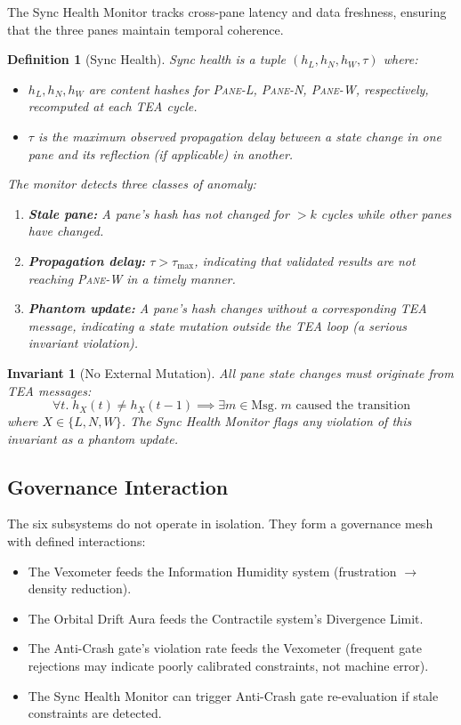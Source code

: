 \documentclass[11pt,a4paper]{article}
\newtheorem{definition}{Definition}[section]
\newtheorem{invariant}{Invariant}[section]
\newcommand{\paneL}{\textsc{Pane-L}}
\newcommand{\paneN}{\textsc{Pane-N}}
\newcommand{\paneW}{\textsc{Pane-W}}
\newcommand{\tea}{\textsc{TEA}}
\begin{document}
The Sync Health Monitor tracks cross-pane latency and data freshness,
ensuring that the three panes maintain temporal coherence.

\begin{definition}[Sync Health]\label{def:sync}
Sync health is a tuple $(h_L, h_N, h_W, \tau)$ where:
\begin{itemize}
  \item $h_L, h_N, h_W$ are content hashes for \paneL{}, \paneN{},
    \paneW{}, respectively, recomputed at each \tea{} cycle.
  \item $\tau$ is the maximum observed propagation delay between
    a state change in one pane and its reflection (if applicable)
    in another.
\end{itemize}
The monitor detects three classes of anomaly:
\begin{enumerate}
  \item \textbf{Stale pane:} A pane's hash has not changed for
    $> k$ cycles while other panes have changed.
  \item \textbf{Propagation delay:} $\tau > \tau_{\max}$,
    indicating that validated results are not reaching
    \paneW{} in a timely manner.
  \item \textbf{Phantom update:} A pane's hash changes without
    a corresponding \tea{} message, indicating a state mutation
    outside the \tea{} loop (a serious invariant violation).
\end{enumerate}
\end{definition}

\begin{invariant}[No External Mutation]\label{inv:no-mutation}
All pane state changes must originate from \tea{} messages:
\[
  \forall t.\; h_X(t) \neq h_X(t-1) \implies
    \exists m \in \text{Msg}.\; m \text{ caused the transition}
\]
where $X \in \{L, N, W\}$. The Sync Health Monitor flags any
violation of this invariant as a phantom update.
\end{invariant}

\subsection{Governance Interaction}

The six subsystems do not operate in isolation. They form a
governance mesh with defined interactions:

\begin{itemize}
  \item The Vexometer feeds the Information Humidity system
    (frustration $\to$ density reduction).
  \item The Orbital Drift Aura feeds the Contractile system's
    Divergence Limit.
  \item The Anti-Crash gate's violation rate feeds the Vexometer
    (frequent gate rejections may indicate poorly calibrated
    constraints, not machine error).
  \item The Sync Health Monitor can trigger Anti-Crash gate
    re-evaluation if stale constraints are detected.
\end{itemize}
\end{document}
